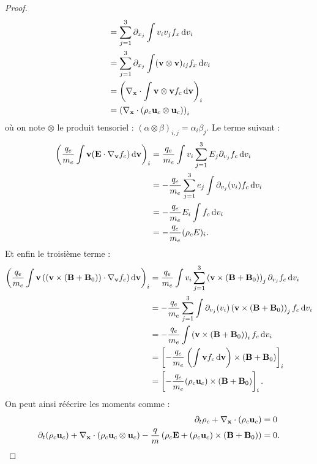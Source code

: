 \begin{proof}
$$\begin{aligned}
          &= \sum_{j=1}^3\partial_{x_j}\int v_iv_jf_x\dd{v_i} \\
          &= \sum_{j=1}^3\partial_{x_j}\int (\vb{v}\otimes\vb{v})_{ij}f_x\dd{v_i} \\
          &= \left( \nabla_{\vb{x}}\cdot\int \vb{v}\otimes\vb{v} f_c\dd{\vb{v}} \right)_i \\
          &= \left( \nabla_{\vb{x}}\cdot(\rho_c\vb{u}_c\otimes\vb{u}_c) \right)_i
    \end{aligned}
  $$
  où on note $\otimes$ le produit tensoriel : $(\alpha\otimes\beta)_{i,j} = \alpha_i\beta_j$. Le terme suivant :
  $$
    \begin{aligned}
      \left( \frac{q_e}{m_e}\int\vb{v}(\vb{E}\cdot\nabla_{\vb{v}}f_c)\dd{\vb{v}} \right)_i
          &= \frac{q_e}{m_e}\int v_i\sum_{j=1}^3 E_j\partial_{v_j}f_c\dd{v_i} \\
          &= -\frac{q_e}{m_e}\sum_{j=1}^3 e_j\int\partial_{v_j}(v_i)f_c\dd{v_i} \\
          &= -\frac{q_e}{m_e}E_i\int f_c\dd{v_i} \\
          &= -\frac{q_e}{m_e}(\rho_c E)_i.
    \end{aligned}
  $$
  Et enfin le troisième terme :
  $$
    \begin{aligned}
      \left( \frac{q_e}{m_e}\int\vb{v}\left((\vb{v}\times(\vb{B}+\vb{B}_0))\cdot\nabla_{\vb{v}}f_c\right)\dd{\vb{v}} \right)_i
          &= \frac{q_e}{m_e}\int v_i\sum_{j=1}^3\left(\vb{v}\times(\vb{B}+\vb{B}_0)\right)_j\partial_{v_j}f_c\dd{v_i} \\
          &= -\frac{q_e}{m_e}\sum_{j=1}^3\int\partial_{v_j}(v_i)\left(\vb{v}\times(\vb{B}+\vb{B}_0)\right)_jf_c\dd{v_i} \\
          &= -\frac{q_e}{m_e}\int\left(\vb{v}\times(\vb{B}+\vb{B}_0)\right)_i f_c\dd{v_i} \\
          &= \left[ -\frac{q_e}{m_e}\left(\int\vb{v}f_c\dd{\vb{v}}\right)\times(\vb{B}+\vb{B}_0) \right]_i \\
          &= \left[ -\frac{q_e}{m_e}(\rho_c\vb{u}_c)\times(\vb{B}+\vb{B}_0) \right]_i.
    \end{aligned}
  $$
  On peut ainsi réécrire les moments comme :
  $$
    \begin{aligned}
      \partial_t\rho_c + \nabla_{\vb{x}}\cdot(\rho_c\vb{u}_c) &= 0 \\
      \partial_t(\rho_c\vb{u}_c) + \nabla_{\vb{x}}\cdot(\rho_c\vb{u}_c\otimes\vb{u}_c) - \frac{q}{m}\left( \rho_c\vb{E} + (\rho_c\vb{u}_c)\times(\vb{B}+\vb{B}_0) \right) &=0.
    \end{aligned}
  $$


\end{proof}
